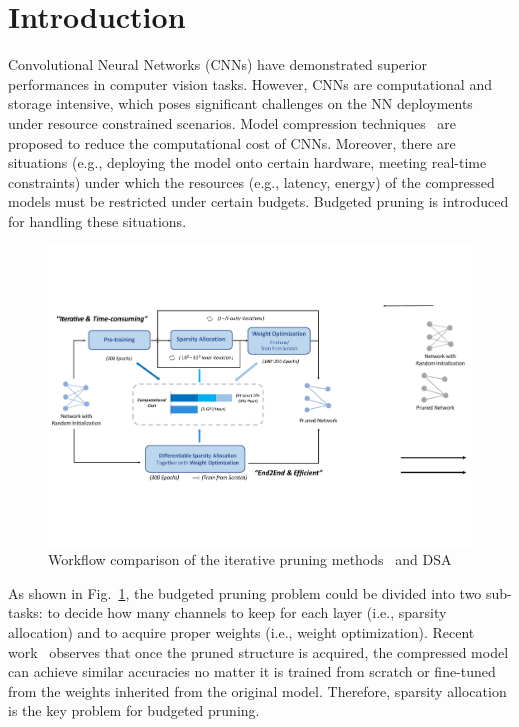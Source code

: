 \documentclass[runningheads]{llncs}
\begin{document}
  
  \section{Introduction}
  
  Convolutional Neural Networks (CNNs) have demonstrated superior performances in computer vision tasks. However, CNNs are computational and storage intensive, which poses significant challenges on the NN deployments under resource constrained scenarios. Model compression techniques~\cite{grouplasso,liu2017learning} are proposed to reduce the computational cost of CNNs. Moreover, there are situations (e.g., deploying the model onto certain hardware, meeting real-time constraints) under which the resources (e.g., latency, energy) of the compressed models must be restricted under certain budgets. Budgeted pruning is introduced for handling these situations. 
  
  \begin{figure}[t]
  \begin{center}
    \includegraphics[width=0.95\linewidth]{figs/dsa_overview.pdf}
    \caption{Workflow comparison of the iterative pruning methods~\cite{netadapt,amc,autocompress,liu2019metapruning} and DSA}
    \label{fig:aif_process}
  \end{center}
  \end{figure}
  
  
  As shown in Fig.~\ref{fig:aif_process}, the budgeted pruning problem could be divided into two sub-tasks: to decide how many channels to keep for each layer (i.e., sparsity allocation) and to acquire proper weights (i.e., weight optimization). Recent work~\cite{rethinking} observes that once the pruned structure is acquired, the compressed model can achieve similar accuracies no matter it is trained from scratch or fine-tuned from the weights inherited from the original model. Therefore, sparsity allocation is the key problem for budgeted pruning.
  
\end{document}
